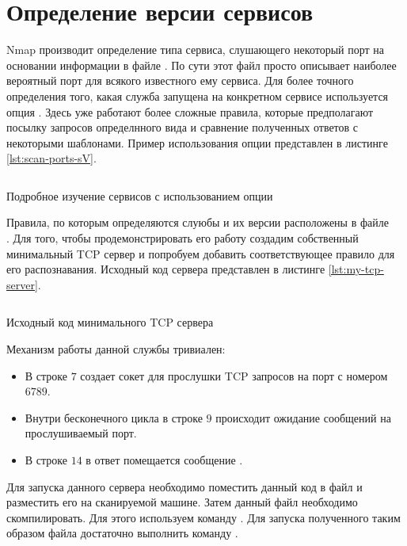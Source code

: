 \section{Определение версии сервисов}

Nmap производит определение типа сервиса, слушающего некоторый порт на основании информации в файле . По сути этот
файл просто описывает наиболее вероятный порт для всякого известного ему сервиса. Для более точного определения того, какая служба
запущена на конкретном сервисе используется опция . Здесь уже работают более сложные правила, которые предполагают посылку
запросов определнного вида и сравнение полученных ответов с некоторыми шаблонами. Пример использования опции  представлен
в листинге \ref{lst:scan-ports-sV}.

\begin{listing}[H]
    \inputminted{console}{resources/06_scan_ports_sV}
    \caption{Подробное изучение сервисов с использованием опции }
    \label{lst:scan-ports-sV}
\end{listing}

Правила, по которым определяются слуюбы и их версии расположены в файле \\ . Для того, чтобы продемонстрировать
его работу создадим собственный минимальный TCP сервер и попробуем добавить соответствующее правило для его распознавания. Исходный код 
сервера представлен в листинге \ref{lst:my-tcp-server}.

\begin{listing}[H]
    \inputminted[linenos=true]{console}{resources/07_my_tcp_server}
    \caption{Исходный код минимального TCP сервера}
    \label{lst:my-tcp-server}
\end{listing}

Механизм работы данной службы тривиален:
\begin{itemize}
    \item В строке $7$ создает сокет для прослушки TCP запросов на порт с номером $6789$.
    \item Внутри бесконечного цикла в строке $9$ происходит ожидание сообщений на прослушиваемый порт.
    \item В строке $14$ в ответ помещается сообщение .
\end{itemize}
Для запуска данного сервера необходимо поместить данный код в файл  и разместить его на сканируемой машине. 
Затем данный файл необходимо скомпилировать. Для этого используем команду . Для запуска полученного таким 
образом  файла достаточно выполнить команду .

